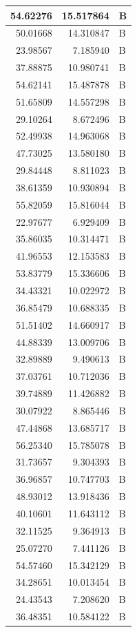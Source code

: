 \documentclass[
  letterpaper,
  DIV=11,
  numbers=noendperiod]{scrartcl}
\begin{document}
\begin{table}
\begin{tabular}[t]{r|r|l}
\hline
54.62276 & 15.517864 & B\\
\hline
50.01668 & 14.310847 & B\\
\hline
23.98567 & 7.185940 & B\\
\hline
37.88875 & 10.980741 & B\\
\hline
54.62141 & 15.487878 & B\\
\hline
51.65809 & 14.557298 & B\\
\hline
29.10264 & 8.672496 & B\\
\hline
52.49938 & 14.963068 & B\\
\hline
47.73025 & 13.580180 & B\\
\hline
29.84448 & 8.811023 & B\\
\hline
38.61359 & 10.930894 & B\\
\hline
55.82059 & 15.816044 & B\\
\hline
22.97677 & 6.929409 & B\\
\hline
35.86035 & 10.314471 & B\\
\hline
41.96553 & 12.153583 & B\\
\hline
53.83779 & 15.336606 & B\\
\hline
34.43321 & 10.022972 & B\\
\hline
36.85479 & 10.688335 & B\\
\hline
51.51402 & 14.660917 & B\\
\hline
44.88339 & 13.009706 & B\\
\hline
32.89889 & 9.490613 & B\\
\hline
37.03761 & 10.712036 & B\\
\hline
39.74889 & 11.426882 & B\\
\hline
30.07922 & 8.865446 & B\\
\hline
47.44868 & 13.685717 & B\\
\hline
56.25340 & 15.785078 & B\\
\hline
31.73657 & 9.304393 & B\\
\hline
36.96857 & 10.747703 & B\\
\hline
48.93012 & 13.918436 & B\\
\hline
40.10601 & 11.643112 & B\\
\hline
32.11525 & 9.364913 & B\\
\hline
25.07270 & 7.441126 & B\\
\hline
54.57460 & 15.342129 & B\\
\hline
34.28651 & 10.013454 & B\\
\hline
24.43543 & 7.208620 & B\\
\hline
36.48351 & 10.584122 & B\\

\end{tabular}
\end{table}
\end{document}
